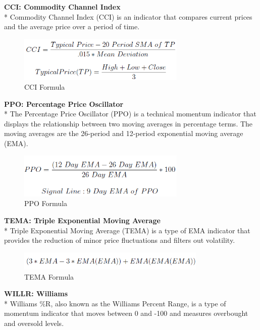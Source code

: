\documentclass[]{article}
\begin{document}
\noindent
\textbf{CCI: Commodity Channel Index} \\*
Commodity Channel Index (CCI) is an indicator that compares current prices and the average price over a period of time.
\begin{figure}[H]
\begin{center}
   \includegraphics[width=80mm,scale=0.8]{assets/formulas/cci.png}
   \caption{CCI Formula}
\end{center}
\end{figure}
\noindent
\textbf{PPO: Percentage Price Oscillator} \\*
The Percentage Price Oscillator (PPO) is a technical momentum indicator that displays the relationship between two moving averages in percentage terms. The moving averages are the 26-period and 12-period exponential moving average (EMA).
\begin{figure}[H]
\begin{center}
   \includegraphics[width=80mm,scale=0.8]{assets/formulas/ppo.png}
   \caption{PPO Formula}
\end{center}
\end{figure}
\noindent
\textbf{TEMA: Triple Exponential Moving Average} \\*
Triple Exponential Moving Average (TEMA) is a type of EMA indicator that provides the reduction of minor price fluctuations and filters out volatility.
\begin{figure}[H]
\begin{center}
   \includegraphics[width=90mm,scale=0.8]{assets/formulas/tema.png}
   \caption{TEMA Formula}
\end{center}
\end{figure}
\noindent
\textbf{WILLR: Williams} \\*
Williams \%R, also known as the Williams Percent Range, is a type of momentum indicator that moves between 0 and -100 and measures overbought and oversold levels.
\end{document}
